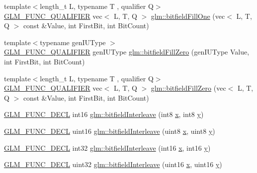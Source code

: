 \begin{DoxyCompactItemize}
\item 
{\footnotesize template$<$length\+\_\+t L, typename T , qualifier Q$>$ }\\\hyperlink{setup_8hpp_a33fdea6f91c5f834105f7415e2a64407}{G\+L\+M\+\_\+\+F\+U\+N\+C\+\_\+\+Q\+U\+A\+L\+I\+F\+I\+ER} vec$<$ L, T, Q $>$ \hyperlink{group__gtc__bitfield_ga3e96dd1f0a4bc892f063251ed118c0c1}{glm\+::bitfield\+Fill\+One} (vec$<$ L, T, Q $>$ const \&Value, int First\+Bit, int Bit\+Count)
\item 
{\footnotesize template$<$typename gen\+I\+U\+Type $>$ }\\\hyperlink{setup_8hpp_a33fdea6f91c5f834105f7415e2a64407}{G\+L\+M\+\_\+\+F\+U\+N\+C\+\_\+\+Q\+U\+A\+L\+I\+F\+I\+ER} gen\+I\+U\+Type \hyperlink{group__gtc__bitfield_ga697b86998b7d74ee0a69d8e9f8819fee}{glm\+::bitfield\+Fill\+Zero} (gen\+I\+U\+Type Value, int First\+Bit, int Bit\+Count)
\item 
{\footnotesize template$<$length\+\_\+t L, typename T , qualifier Q$>$ }\\\hyperlink{setup_8hpp_a33fdea6f91c5f834105f7415e2a64407}{G\+L\+M\+\_\+\+F\+U\+N\+C\+\_\+\+Q\+U\+A\+L\+I\+F\+I\+ER} vec$<$ L, T, Q $>$ \hyperlink{group__gtc__bitfield_ga0d16c9acef4be79ea9b47c082a0cf7c2}{glm\+::bitfield\+Fill\+Zero} (vec$<$ L, T, Q $>$ const \&Value, int First\+Bit, int Bit\+Count)
\item 
\hyperlink{setup_8hpp_ab2d052de21a70539923e9bcbf6e83a51}{G\+L\+M\+\_\+\+F\+U\+N\+C\+\_\+\+D\+E\+CL} int16 \hyperlink{group__gtc__bitfield_ga479134317bc95d99f2b2e235d3db287b}{glm\+::bitfield\+Interleave} (int8 \hyperlink{_s_d_l__opengl_8h_ad0e63d0edcdbd3d79554076bf309fd47}{x}, int8 \hyperlink{_s_d_l__opengl_8h_a1675d9d7bb68e1657ff028643b4037e3}{y})
\item 
\hyperlink{setup_8hpp_ab2d052de21a70539923e9bcbf6e83a51}{G\+L\+M\+\_\+\+F\+U\+N\+C\+\_\+\+D\+E\+CL} uint16 \hyperlink{group__gtc__bitfield_ga0700a3ceb088a0ecc23d76c154096061}{glm\+::bitfield\+Interleave} (uint8 \hyperlink{_s_d_l__opengl_8h_ad0e63d0edcdbd3d79554076bf309fd47}{x}, uint8 \hyperlink{_s_d_l__opengl_8h_a1675d9d7bb68e1657ff028643b4037e3}{y})
\item 
\hyperlink{setup_8hpp_ab2d052de21a70539923e9bcbf6e83a51}{G\+L\+M\+\_\+\+F\+U\+N\+C\+\_\+\+D\+E\+CL} int32 \hyperlink{group__gtc__bitfield_ga1a0264598647ae00a596865af4e1e878}{glm\+::bitfield\+Interleave} (int16 \hyperlink{_s_d_l__opengl_8h_ad0e63d0edcdbd3d79554076bf309fd47}{x}, int16 \hyperlink{_s_d_l__opengl_8h_a1675d9d7bb68e1657ff028643b4037e3}{y})
\item 
\hyperlink{setup_8hpp_ab2d052de21a70539923e9bcbf6e83a51}{G\+L\+M\+\_\+\+F\+U\+N\+C\+\_\+\+D\+E\+CL} uint32 \hyperlink{group__gtc__bitfield_ga19ef8360379483e3ee245e89cb62ff93}{glm\+::bitfield\+Interleave} (uint16 \hyperlink{_s_d_l__opengl_8h_ad0e63d0edcdbd3d79554076bf309fd47}{x}, uint16 \hyperlink{_s_d_l__opengl_8h_a1675d9d7bb68e1657ff028643b4037e3}{y})

\end{DoxyCompactItemize}
